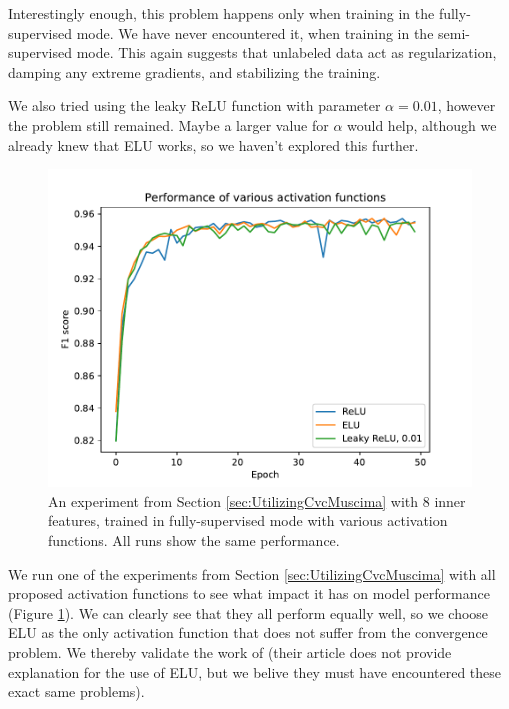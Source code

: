 Interestingly enough, this problem happens only when training in the fully-supervised mode. We have never encountered it, when training in the semi-supervised mode. This again suggests that unlabeled data act as regularization, damping any extreme gradients, and stabilizing the training.

We also tried using the leaky ReLU function with parameter $\alpha = 0.01$, however the problem still remained. Maybe a larger value for $\alpha$ would help, although we already knew that ELU works, so we haven't explored this further.

\begin{figure}[ht]
    \centering
    \includegraphics[width=140mm]{../../figures/03-activation-function/performance.pdf}
    \caption{An experiment from Section \ref{sec:UtilizingCvcMuscima} with 8 inner features, trained in fully-supervised mode with various activation functions. All runs show the same performance.}
    \label{fig:ActivationFunctionPerformances}
\end{figure}

We run one of the experiments from Section \ref{sec:UtilizingCvcMuscima} with all proposed activation functions to see what impact it has on model performance (Figure \ref{fig:ActivationFunctionPerformances}). We can clearly see that they all perform equally well, so we choose ELU as the only activation function that does not suffer from the convergence problem. We thereby validate the work of \cite{DorferEtAl} (their article does not provide explanation for the use of ELU, but we belive they must have encountered these exact same problems).


